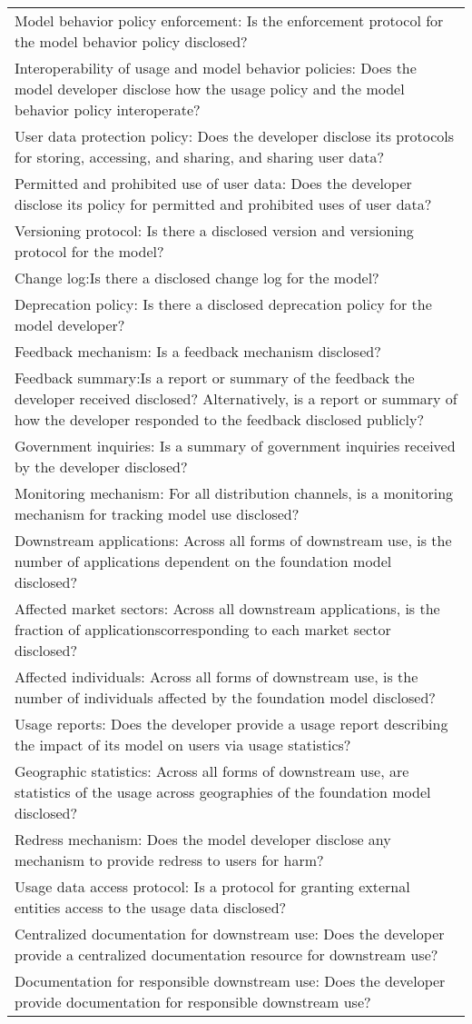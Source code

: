 \begin{table}
\begin{tabular}{l}
Model behavior policy enforcement: Is the enforcement protocol for the model behavior policy disclosed? \\
Interoperability of usage and model behavior policies: Does the model developer disclose how the usage policy and the model behavior policy interoperate? \\
User data protection policy: Does the developer disclose its protocols for storing, accessing, and sharing, and sharing user data?\\
Permitted and prohibited use of user data: Does the developer disclose its policy for permitted and prohibited uses of user data? \\
Versioning protocol: Is there a disclosed version and versioning protocol for the model? \\
Change log:Is there a disclosed change log for the model? \\
Deprecation policy: Is there a disclosed deprecation policy for the model developer?\\
Feedback mechanism: Is a feedback mechanism disclosed? \\
Feedback summary:Is a report or summary of the feedback the developer received disclosed? Alternatively, is a report or summary of how the developer responded to the feedback disclosed publicly?\\
Government inquiries: Is a summary of government inquiries received by the developer disclosed? \\
Monitoring mechanism: For all distribution channels, is a monitoring mechanism for tracking model use disclosed? \\
Downstream applications: Across all forms of downstream use, is the number of applications dependent on the foundation model disclosed? \\
Affected market sectors: Across all downstream applications, is the fraction of applicationscorresponding to each market sector disclosed?\\
Affected individuals: Across all forms of downstream use, is the number of individuals affected by the foundation model disclosed?\\
Usage reports: Does the developer provide a usage report describing the impact of its model on users via usage statistics?\\
Geographic statistics: Across all forms of downstream use, are statistics of the usage across geographies of the foundation model disclosed?\\
Redress mechanism: Does the model developer disclose any mechanism to provide redress to users for harm? \\
Usage data access protocol: Is a protocol for granting external entities access to the usage data disclosed?\\
Centralized documentation for downstream use: Does the developer provide a centralized documentation resource for downstream use? \\
Documentation for responsible downstream use: Does the developer provide documentation for responsible downstream use?
\end{tabular}
\end{table}